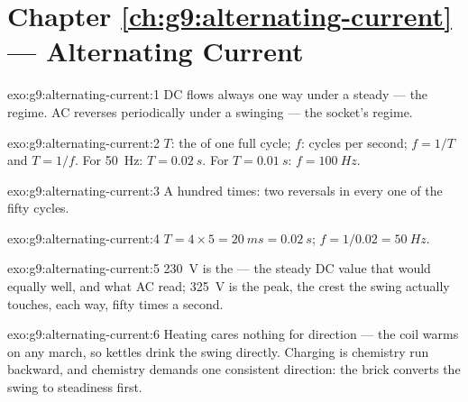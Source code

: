 \section*{Chapter \ref{ch:g9:alternating-current} --- Alternating Current}

\begin{solution}{exo:g9:alternating-current:1}
DC flows always one way under a steady  --- the
 regime. AC reverses periodically under a swinging
 --- the socket's regime.
\end{solution}

\begin{solution}{exo:g9:alternating-current:2}
$T$: the  of one full cycle; $f$: cycles per second;
$f = 1/T$ and $T = 1/f$. For \qty{50}{Hz}: $T =
\qty{0.02}{s}$. For $T = \qty{0.01}{s}$: $f = \qty{100}{Hz}$.
\end{solution}

\begin{solution}{exo:g9:alternating-current:3}
A hundred times: two reversals in every one of the fifty
cycles.
\end{solution}

\begin{solution}{exo:g9:alternating-current:4}
$T = 4 \times 5 = \qty{20}{ms} = \qty{0.02}{s}$; $f = 1/0.02
= \qty{50}{Hz}$.
\end{solution}

\begin{solution}{exo:g9:alternating-current:5}
\qty{230}{V} is the  --- the steady DC value
that would  equally well, and what AC  read;
\qty{325}{V} is the peak, the crest the swing actually
touches, each way, fifty times a second.
\end{solution}

\begin{solution}{exo:g9:alternating-current:6}
Heating cares nothing for direction --- the coil warms on any
march, so kettles drink the swing directly. Charging is
chemistry run backward, and chemistry demands one consistent
direction: the brick converts the swing to steadiness first.
\end{solution}

